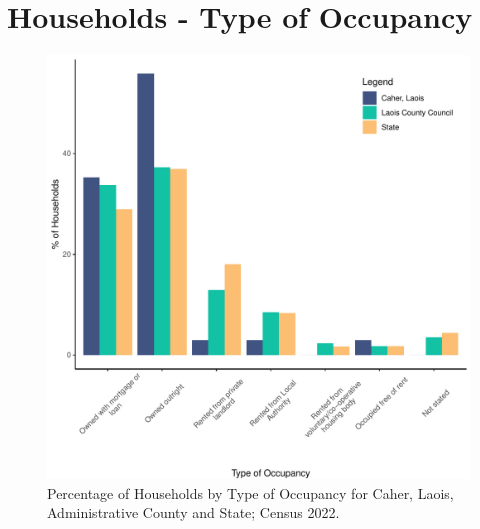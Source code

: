 \documentclass{article}
\begin{document}
\section{Households - Type of Occupancy}\label{sect:Households}
\begin{figure}[H]
	\centering
	\includegraphics[width = 140mm]{../figures/HouseholdsED.pdf}
	\caption{Percentage of Households by Type of Occupancy for Caher, Laois, Administrative County and State; Census 2022.}
	\label{fig:vbnv}
	\end{figure}
\end{document}
